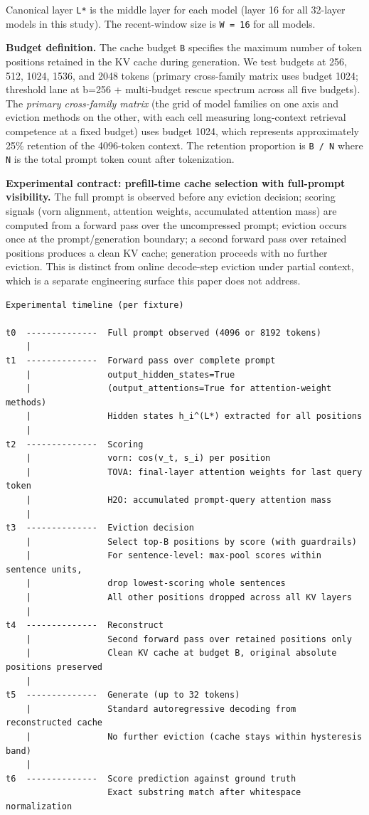 \documentclass[
]{article}
\begin{document}
Canonical layer \texttt{L*} is the middle layer for each model (layer 16
for all 32-layer models in this study). The recent-window size is
\texttt{W\ =\ 16} for all models.

\textbf{Budget definition.} The cache budget \texttt{B} specifies the
maximum number of token positions retained in the KV cache during
generation. We test budgets at 256, 512, 1024, 1536, and 2048 tokens
(primary cross-family matrix uses budget 1024; threshold lane at
b=256 + multi-budget rescue spectrum across all five budgets). The
\emph{primary cross-family matrix} (the grid of model families on one
axis and eviction methods on the other, with each cell measuring
long-context retrieval competence at a fixed budget) uses budget 1024,
which represents approximately 25\% retention of the 4096-token context.
The retention proportion is \texttt{B\ /\ N} where \texttt{N} is the
total prompt token count after tokenization.

\textbf{Experimental contract: prefill-time cache selection with
full-prompt visibility.} The full prompt is observed before any eviction
decision; scoring signals (vorn alignment, attention weights,
accumulated attention mass) are computed from a forward pass over the
uncompressed prompt; eviction occurs once at the prompt/generation
boundary; a second forward pass over retained positions produces a
clean KV cache; generation proceeds with no further eviction. This is
distinct from online decode-step eviction under partial context, which
is a separate engineering surface this paper does not address.

\begin{verbatim}
Experimental timeline (per fixture)

t0  --------------  Full prompt observed (4096 or 8192 tokens)
    |
t1  --------------  Forward pass over complete prompt
    |               output_hidden_states=True
    |               (output_attentions=True for attention-weight methods)
    |               Hidden states h_i^(L*) extracted for all positions
    |
t2  --------------  Scoring
    |               vorn: cos(v_t, s_i) per position
    |               TOVA: final-layer attention weights for last query token
    |               H2O: accumulated prompt-query attention mass
    |
t3  --------------  Eviction decision
    |               Select top-B positions by score (with guardrails)
    |               For sentence-level: max-pool scores within sentence units,
    |               drop lowest-scoring whole sentences
    |               All other positions dropped across all KV layers
    |
t4  --------------  Reconstruct
    |               Second forward pass over retained positions only
    |               Clean KV cache at budget B, original absolute positions preserved
    |
t5  --------------  Generate (up to 32 tokens)
    |               Standard autoregressive decoding from reconstructed cache
    |               No further eviction (cache stays within hysteresis band)
    |
t6  --------------  Score prediction against ground truth
                    Exact substring match after whitespace normalization
\end{verbatim}
\end{document}
